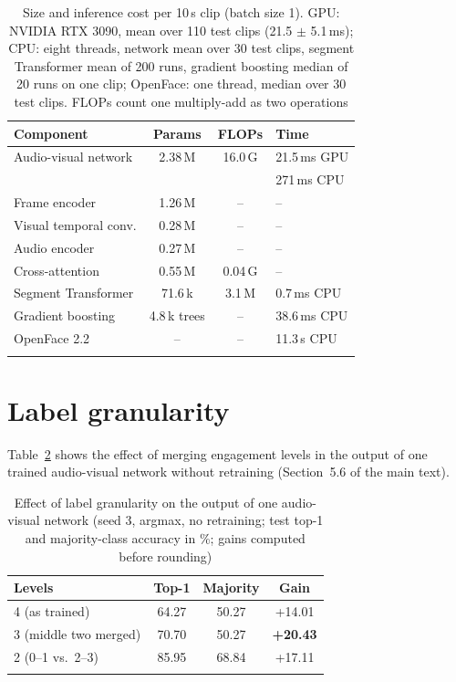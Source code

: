 \documentclass[pdflatex,sn-basic]{sn-jnl}
\begin{document}
\begin{table}[t]
\caption{Size and inference cost per 10\,s clip (batch size 1). GPU: NVIDIA RTX 3090, mean over 110 test clips (21.5 $\pm$ 5.1\,ms); CPU: eight threads, network mean over 30 test clips, segment Transformer mean of 200 runs, gradient boosting median of 20 runs on one clip; OpenFace: one thread, median over 30 test clips. FLOPs count one multiply-add as two operations}\label{tab:cost}
\begin{tabular*}{0.8\textwidth}{@{\extracolsep\fill}lccl}
\toprule
Component & Params & FLOPs & Time\\
\midrule
Audio-visual network & 2.38\,M & 16.0\,G & 21.5\,ms GPU\\
 & & & 271\,ms CPU\\
\quad Frame encoder & 1.26\,M & -- & --\\
\quad Visual temporal conv. & 0.28\,M & -- & --\\
\quad Audio encoder & 0.27\,M & -- & --\\
\quad Cross-attention & 0.55\,M & 0.04\,G & --\\
Segment Transformer & 71.6\,k & 3.1\,M & 0.7\,ms CPU\\
Gradient boosting & 4.8\,k trees & -- & 38.6\,ms CPU\\
OpenFace 2.2 & -- & -- & 11.3\,s CPU\\
\botrule
\end{tabular*}
\end{table}

\section{Label granularity}\label{sec:s_gran}

Table~\ref{tab:granularity} shows the effect of merging engagement levels in the output of one trained audio-visual network without retraining (Section~5.6 of the main text).

\begin{table}[t]
\caption{Effect of label granularity on the output of one audio-visual network (seed 3, argmax, no retraining; test top-1 and majority-class accuracy in \%; gains computed before rounding)}\label{tab:granularity}
\begin{tabular*}{0.6\textwidth}{@{\extracolsep\fill}lccc}
\toprule
Levels & Top-1 & Majority & Gain\\
\midrule
4 (as trained) & 64.27 & 50.27 & +14.01\\
3 (middle two merged) & 70.70 & 50.27 & \textbf{+20.43}\\
2 (0--1 vs.\ 2--3) & 85.95 & 68.84 & +17.11\\
\botrule
\end{tabular*}
\end{table}
\end{document}
